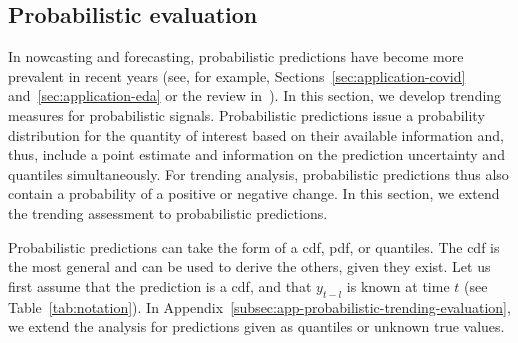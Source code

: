 \documentclass[pdflatex]{sn-jnl}
\theoremstyle{plain}%
\theoremstyle{definition}
\begin{document}
\subsection{Probabilistic evaluation}\label{subsec:aatc-probabilistic}

In nowcasting and forecasting, probabilistic predictions have become more prevalent in recent years (see, for example, Sections~\ref{sec:application-covid} and~\ref{sec:application-eda} or the review in~\cite{Gneiting2014}).
In this section, we develop trending measures for probabilistic signals.
Probabilistic predictions issue a probability distribution for the quantity of interest based on their available information and, thus, include a point estimate and information on the prediction uncertainty and quantiles simultaneously.
For trending analysis, probabilistic predictions thus also contain a probability of a positive or negative change.
In this section, we extend the trending assessment to probabilistic predictions.

Probabilistic predictions can take the form of a \ac{cdf}, \ac{pdf}, or quantiles.
The \ac{cdf} is the most general and can be used to derive the others, given they exist.
Let us first assume that the prediction is a \ac{cdf}, and that $y_{t-l}$ is known at time $t$ (see Table~\ref{tab:notation}).
In Appendix~\ref{subsec:app-probabilistic-trending-evaluation}, we extend the analysis for predictions given as quantiles or unknown true values.
\end{document}

